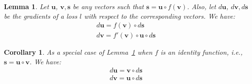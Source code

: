 \documentclass[12pt]{report}
\newcommand{\lemmaref}[1]{Lemma~\ref{#1}}
\newcommand{\paren}[1]{\left(#1\right)}
\newcommand{\edot}{\circ}
\newtheorem{lemma}{Lemma}
\newtheorem{corollary}{Corollary}
\begin{document}
\begin{lemma}
\label{l:edot_der}
Let $\bm{u}$, $\bm{v}, \bm{s}$ be any vectors such that  $\bm{s} = \bm{u} \edot
f(\bm{v})$. Also, let $d\bm{u}$, $d\bm{v}, d\bm{s}$ be the gradients of a loss $l$ with
respect to the corresponding vectors. We have:
\begin{align}
d\bm{u} = f(\bm{v}) \edot d\bm{s} \\
d\bm{v} = f'(\bm{v}) \edot \bm{u} \edot d\bm{s} 
\end{align}
\end{lemma}


\begin{corollary}
\label{c:edot_der}
As a special case of \lemmaref{l:edot_der} when $f$ is an identity function,
i.e.,  $\bm{s} = \bm{u} \edot \bm{v}$. We have:
\begin{align}
d\bm{u} = \bm{v} \edot d\bm{s} \\
d\bm{v} = \bm{u} \edot d\bm{s} 
\end{align}
\end{corollary}


%



\end{document}
